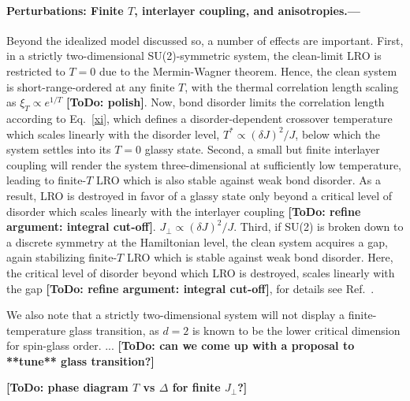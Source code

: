 \documentclass[twocolumn,english,aps,showpacs,prl,floatfix]{revtex4-1}
\newcommand{\todo}[1]{{\color{red} {\bf [ToDo: #1]}}}
\begin{document}
\paragraph{Perturbations: Finite $T$, interlayer coupling, and anisotropies.---}
%
Beyond the idealized model discussed so, a number of effects are important.
%
First, in a strictly two-dimensional SU(2)-symmetric system, the clean-limit LRO is restricted to $T\!=\!0$ due to the Mermin-Wagner theorem. Hence, the clean system is short-range-ordered at any finite $T$, with the thermal correlation length scaling as $\xi_T \propto e^{1/T}$ \todo{polish}. Now, bond disorder limits the correlation length according to Eq.~\eqref{xi}, which defines a disorder-dependent crossover temperature which scales linearly with the disorder level, $T^\ast \propto (\delta J)^2/J$, below which the system settles into its $T\!=\!0$ glassy state.
%
Second, a small but finite interlayer coupling will render the system three-dimensional at sufficiently low temperature, leading to finite-$T$ LRO which is also stable against weak bond disorder. As a result, LRO is destroyed in favor of a glassy state only beyond a critical level of disorder which scales linearly with the interlayer coupling \todo{refine argument: integral cut-off}. $J_\perp \propto (\delta J)^2/J$.
%
Third, if SU(2) is broken down to a discrete symmetry at the Hamiltonian level, the clean system acquires a gap, again stabilizing finite-$T$ LRO which is stable against weak bond disorder. Here, the critical level of disorder beyond which LRO is destroyed, scales linearly with the gap \todo{refine argument: integral cut-off}, for details see Ref.~.

We also note that a strictly two-dimensional system will not display a finite-temperature glass transition, as $d\!=\!2$ is known to be the lower critical dimension for spin-glass order.
...
\todo{can we come up with a proposal to **tune** glass transition?}

\todo{phase diagram $T$ vs $\Delta$ for finite $J_\perp$?}
\end{document}
